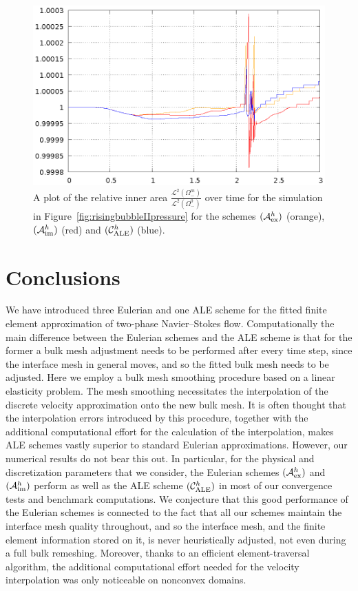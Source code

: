 \documentclass[a4paper,12pt,onecolumn]{article}
\newcommand{\schemeAex}{{\mathcal{A}^h_{\rm ex}}}
\newcommand{\schemeAim}{{\mathcal{A}^h_{\rm im}}}
\newcommand{\schemeALE}{{\mathcal{C}^h_{\rm ALE}}}
\begin{document}
\begin{figure}[htbp]
\centering
\includegraphics[width=.45\textwidth]
{figures/rising_bubble_II_inner_volume.ps}
\caption{A plot of the relative inner area
$\frac{\mathcal{L}^2(\Omega^m_-)}{\mathcal{L}^2(\Omega^0_-)}$ over time for the
simulation in Figure~\ref{fig:risingbubbleIIpressure} for the schemes
$(\schemeAex)$ (orange), $(\schemeAim)$ (red) and $(\schemeALE)$ (blue).}
\label{fig:risingbubbleIIinnervolume}
\end{figure}%

\section*{Conclusions}
We have introduced three Eulerian and one ALE scheme for the fitted finite
element approximation of two-phase Navier--Stokes flow. Computationally the
main difference between the Eulerian schemes and the ALE scheme is that
for the former a bulk mesh adjustment needs to be performed after every time
step, since the interface mesh in general moves, and so the fitted bulk mesh
needs to be adjusted. Here we employ a bulk mesh smoothing procedure based
on a linear elasticity problem. The mesh smoothing necessitates the
interpolation of the discrete velocity approximation onto the new bulk mesh.
It is often thought that the interpolation errors introduced by this procedure,
together with the additional computational effort for the calculation of the
interpolation, makes ALE schemes vastly superior to standard Eulerian
approximations. However, our numerical results do not bear this out.
In particular, for the physical and discretization parameters that we consider,
the Eulerian schemes $(\schemeAex)$ and $(\schemeAim)$ perform
as well as the ALE scheme $(\schemeALE)$ in most of our convergence tests
and benchmark computations. We conjecture that this good performance of
the Eulerian schemes is connected to the fact that all our schemes
maintain the interface mesh quality throughout, and so the
interface mesh, and the finite element information stored on it,
is never heuristically adjusted, not even during a full bulk remeshing.
Moreover, thanks to an efficient element-traversal
algorithm, the additional computational effort needed
for the velocity interpolation was only noticeable on nonconvex domains.



\end{document}
